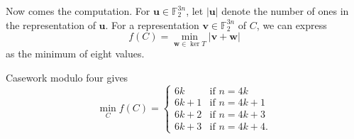 Now comes the computation. For $\mathbf u\in\mathbb F_2^{3n}$, let $\left\lvert\mathbf u\right\rvert$ denote the number of ones in the representation of $\mathbf u$. For a representation $\mathbf v\in\mathbb F_2^{3n}$ of $C$, we can express \[f(C)=\min_{\mathbf w\in\ker T}\left\lvert\mathbf v+\mathbf w\right\rvert\]
as the minimum of eight values.

Casework modulo four gives
\[\min_Cf(C)=\begin{cases}
        6k&\text{if }n=4k\\
        6k+1&\text{if }n=4k+1\\
        6k+2&\text{if }n=4k+3\\
        6k+3&\text{if }n=4k+4.
\end{cases}\]

